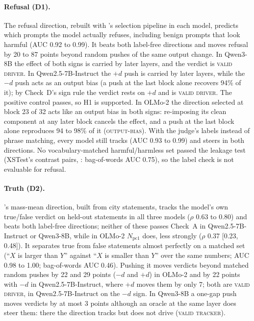 \documentclass[11pt]{article}
\newcommand{\verdict}[1]{\textsc{\MakeLowercase{#1}}}
\begin{document}
\paragraph{Refusal (D1).} The refusal direction, rebuilt with \citet{arditi2024refusal}'s selection pipeline in each model, predicts which prompts the model actually refuses, including benign prompts that look harmful (AUC 0.92 to 0.99). It beats both label-free directions and moves refusal by 20 to 87 points beyond random pushes of the same output change. In Qwen3-8B the effect of both signs is carried by later layers, and the verdict is \verdict{VALID DRIVER}. In Qwen2.5-7B-Instruct the $+d$ push is carried by later layers, while the $-d$ push acts as an output bias (a push at the last block alone recovers 94\% of it); by Check~D's sign rule the verdict rests on $+d$ and is \verdict{VALID DRIVER}. The positive control passes, so H1 is supported. In OLMo-2 the direction selected at block 23 of 32 acts like an output bias in both signs: re-imposing its clean component at any later block cancels the effect, and a push at the last block alone reproduces 94 to 98\% of it (\verdict{OUTPUT-BIAS}). With the judge's labels instead of phrase matching, every model still tracks (AUC 0.93 to 0.99) and steers in both directions. No vocabulary-matched harmful/harmless set passed the leakage test (XSTest's contrast pairs, \citealp{rottger2024xstest}: bag-of-words AUC 0.75), so the label check is not evaluable for refusal.

\paragraph{Truth (D2).} \citet{marks2024geometry}'s mass-mean direction, built from city statements, tracks the model's own true/false verdict on held-out statements in all three models ($\rho$ 0.63 to 0.80) and beats both label-free directions; neither of these passes Check~A in Qwen2.5-7B-Instruct or Qwen3-8B, while in OLMo-2 $N_\text{pc1}$ does, less strongly ($\rho$ 0.37 [0.23, 0.48]). It separates true from false statements almost perfectly on a matched set (``$X$ is larger than $Y$'' against ``$X$ is smaller than $Y$'' over the same numbers; AUC 0.98 to 1.00; bag-of-words AUC 0.46). Pushing it moves verdicts beyond matched random pushes by 22 and 29 points ($-d$ and $+d$) in OLMo-2 and by 22 points with $-d$ in Qwen2.5-7B-Instruct, where $+d$ moves them by only 7; both are \verdict{VALID DRIVER}, in Qwen2.5-7B-Instruct on the $-d$ sign. In Qwen3-8B a one-gap push moves verdicts by at most 3 points although an oracle at the same layer does steer them: there the direction tracks but does not drive (\verdict{VALID TRACKER}).
\end{document}
